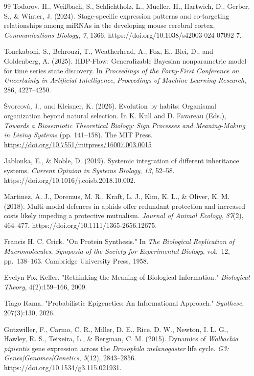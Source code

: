 \documentclass[pdflatex,sn-mathphys-num]{sn-jnl}
\theoremstyle{thmstylethree}
\theoremstyle{thmstyleone}
\begin{document}
\begin{thebibliography}{99}
Todorov, H., Wei{\ss}bach, S., Schlichtholz, L., Mueller, H., Hartwich, D., Gerber, S., \& Winter, J. (2024).
Stage-specific expression patterns and co-targeting relationships among miRNAs in the developing mouse cerebral cortex.
\textit{Communications Biology}, \textit{7}, 1366.
https://doi.org/10.1038/s42003-024-07092-7.

Tonekaboni, S., Behrouzi, T., Weatherhead, A., Fox, E., Blei, D., and Goldenberg, A. (2025).
HDP-Flow: Generalizable Bayesian nonparametric model for time series state discovery.
In \textit{Proceedings of the Forty-First Conference on Uncertainty in Artificial Intelligence},
\textit{Proceedings of Machine Learning Research}, 286, 4227--4250.

\v{S}vorcov\'a, J., and Kleisner, K. (2026).
Evolution by habits: Organismal organization beyond natural selection.
In K. Kull and D. Favareau (Eds.),
\textit{Towards a Biosemiotic Theoretical Biology: Sign Processes and Meaning-Making in Living Systems}
(pp. 141--158).
The MIT Press.
\url{https://doi.org/10.7551/mitpress/16007.003.0015}

Jablonka, E., \& Noble, D. (2019).
Systemic integration of different inheritance systems.
\textit{Current Opinion in Systems Biology}, \textit{13}, 52--58.
https://doi.org/10.1016/j.coisb.2018.10.002.

Martinez, A. J., Doremus, M. R., Kraft, L. J., Kim, K. L., \& Oliver, K. M. (2018).
Multi-modal defences in aphids offer redundant protection and increased costs likely impeding a protective mutualism.
\textit{Journal of Animal Ecology}, \textit{87}(2), 464--477.
https://doi.org/10.1111/1365-2656.12675.

Francis H. C. Crick.
"On Protein Synthesis."
In \textit{The Biological Replication of Macromolecules},
\textit{Symposia of the Society for Experimental Biology},
vol.~12, pp.~138--163.
Cambridge University Press, 1958.

Evelyn Fox Keller.
"Rethinking the Meaning of Biological Information."
\textit{Biological Theory}, 4(2):159--166, 2009.

Tiago Rama.
"Probabilistic Epigenetics: An Informational Approach."
\textit{Synthese}, 207(3):130, 2026.

Gutzwiller, F., Carmo, C. R., Miller, D. E., Rice, D. W., Newton, I. L. G.,
Hawley, R. S., Teixeira, L., \& Bergman, C. M. (2015).
Dynamics of \textit{Wolbachia pipientis} gene expression across the
\textit{Drosophila melanogaster} life cycle.
\textit{G3: Genes|Genomes|Genetics}, \textit{5}(12), 2843--2856.
https://doi.org/10.1534/g3.115.021931.


\end{thebibliography}
\end{document}
